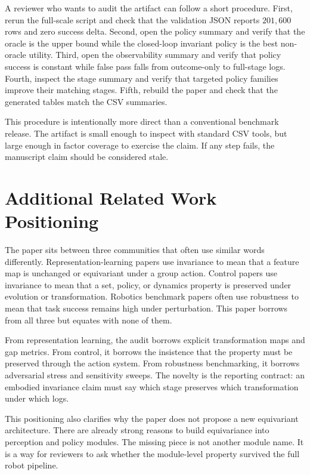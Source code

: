 \documentclass{article}
\begin{document}
A reviewer who wants to audit the artifact can follow a short procedure. First, rerun the full-scale script and check that the validation JSON reports $201{,}600$ rows and zero success delta. Second, open the policy summary and verify that the oracle is the upper bound while the closed-loop invariant policy is the best non-oracle utility. Third, open the observability summary and verify that policy success is constant while false pass falls from outcome-only to full-stage logs. Fourth, inspect the stage summary and verify that targeted policy families improve their matching stages. Fifth, rebuild the paper and check that the generated tables match the CSV summaries.

This procedure is intentionally more direct than a conventional benchmark release. The artifact is small enough to inspect with standard CSV tools, but large enough in factor coverage to exercise the claim. If any step fails, the manuscript claim should be considered stale.

\section{Additional Related Work Positioning}

The paper sits between three communities that often use similar words differently. Representation-learning papers use invariance to mean that a feature map is unchanged or equivariant under a group action. Control papers use invariance to mean that a set, policy, or dynamics property is preserved under evolution or transformation. Robotics benchmark papers often use robustness to mean that task success remains high under perturbation. This paper borrows from all three but equates with none of them.

From representation learning, the audit borrows explicit transformation maps and gap metrics. From control, it borrows the insistence that the property must be preserved through the action system. From robustness benchmarking, it borrows adversarial stress and sensitivity sweeps. The novelty is the reporting contract: an embodied invariance claim must say which stage preserves which transformation under which logs.

This positioning also clarifies why the paper does not propose a new equivariant architecture. There are already strong reasons to build equivariance into perception and policy modules. The missing piece is not another module name. It is a way for reviewers to ask whether the module-level property survived the full robot pipeline.
\end{document}
